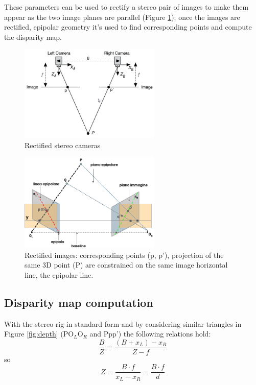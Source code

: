 These parameters can be used to rectify a stereo pair of images to make them appear as the two image planes are parallel (Figure \ref{fig:rect_stereo}); once the images are rectified, epipolar geometry it's used to find corresponding points and compute the disparity map\cite{ZISS}.
\begin{figure}[h!]
\centering
\includegraphics[width=0.6\textwidth]{./img/rect_stereo.png}
\caption{\small{Rectified stereo cameras}}
\label{fig:rect_stereo}
\end{figure}
\begin{figure}[h!]
\centering
\includegraphics[width=0.6\textwidth]{./img/standard.png}
\caption{\small{Rectified images: corresponding points (p, p'), projection of the same 3D point (P) are constrained on the same image horizontal line, the epipolar line.}}
\label{fig:std}
\end{figure}

\newpage
\subsection{Disparity map computation}

With the stereo rig in standard form and by considering similar triangles in Figure \ref{fig:depth} (PO$_{L}$O$_{R}$ and Ppp') the following relations hold: 
\begin{equation}
\frac{B}{Z} = \frac{(B+x_{L}) - x_{R}}{Z-f} 
\end{equation}
so
\begin{equation}
Z = \frac{B \cdot f}{x_{L} - x_{R}} = \frac{B \cdot f}{d}
\end{equation}

